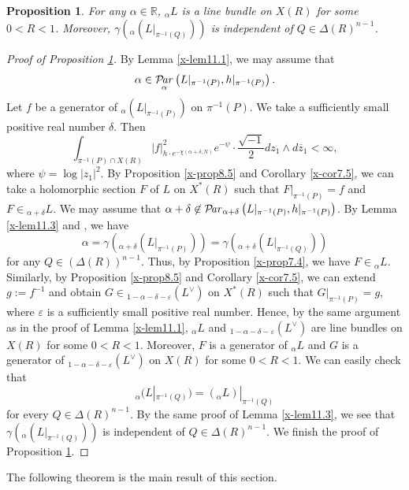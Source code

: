 \documentclass[12pt,twoside]{amsart}
\DeclareMathOperator{\Par}{\mathcal{P}\!\it{ar}}
\newtheorem{prop}[thm]{Proposition}
\theoremstyle{definition}
\begin{document}
\begin{prop}\label{x-prop11.4}
For any $\alpha \in \mathbb R$, ${}_\alpha L$ is a line bundle 
on $X(R)$ for some $0<R<1$. 
Moreover, $\gamma \left({}_\alpha (L|_{\pi^{-1}(Q)})\right)$ is independent of 
$Q\in \Delta(R)^{n-1}$. 
\end{prop}
\begin{proof}[Proof of Proposition \ref{x-prop11.4}]
By Lemma \ref{x-lem11.1}, we may assume that 
\[
\alpha \in \Par_\alpha \left(L|_{\pi^{-1}(P)}, h|_{\pi^{-1}(P)}\right). 
\]
Let $f$ be a generator of ${}_\alpha (L|_{\pi^{-1}(P)})$ on $\pi^{-1}(P)$. 
We take a sufficiently small positive real number $\delta$. 
Then 
\[
\int _{\pi^{-1}(P)\cap X(R)} |f|^2_{h\cdot e^{-\chi (\alpha +\delta, N)}} 
e^{-\psi}\cdot 
\frac{\sqrt{-1}}{2} dz_1\wedge d\overline z_1<\infty,  
\] 
where $\psi=\log |z_1|^2$. 
By Proposition \ref{x-prop8.5} and Corollary \ref{x-cor7.5}, 
we can take a holomorphic section $F$ of $L$ on $X^*(R)$ 
such that $F|_{\pi^{-1}(P)}=f$ and $F\in{}_{\alpha +\delta}L$. 
We may assume that 
$\alpha +\delta\not\in \Par_{\alpha+\delta} \left(L|_{\pi^{-1}(P)}, 
h|_{\pi^{-1}(P)}\right)$. 
By Lemma \ref{x-lem11.3} and \cite[Lemma 13.1]{fujino-fujisawa-ono}, 
we have 
\[
\alpha=\gamma \left({}_{\alpha+\delta} (L|_{\pi^{-1}(P)})\right)
=\gamma \left({}_{\alpha+\delta} (L|_{\pi^{-1}(Q)})\right)
\]
for any $Q\in (\Delta(R))^{n-1}$. 
Thus, by Proposition \ref{x-prop7.4}, 
we have $F\in {}_\alpha L$. Similarly, by 
Proposition \ref{x-prop8.5} and Corollary \ref{x-cor7.5}, we can extend $g:=f^{-1}$ and obtain $G\in 
{}_{1-\alpha -\delta-\varepsilon} (L^\vee)$ on $X^*(R)$ such that 
$G|_{\pi^{-1}(P)} =g$, where 
$\varepsilon$ is a sufficiently small positive real number. Hence, by the same argument 
as in the proof of Lemma \ref{x-lem11.1}, 
${}_\alpha L$ and ${}_{1-\alpha -\delta-\varepsilon}(L^\vee)$ are line bundles 
on $X(R)$ for some $0<R<1$. 
Moreover, $F$ is a generator of ${}_\alpha L$ and 
$G$ is a generator of ${}_{1-\alpha-\delta-\varepsilon} (L^\vee)$ on 
$X(R)$ for some $0<R<1$. 
We can easily check that 
\[
{}_\alpha (L|_{\pi^{-1}(Q)})=({}_\alpha L)|_{\pi^{-1}(Q)}
\]
for every $Q\in \Delta(R)^{n-1}$. 
By the same proof of Lemma \ref{x-lem11.3}, 
we see that $\gamma \left({}_\alpha (L|_{\pi^{-1}(Q)})\right)$ is independent 
of $Q\in \Delta(R)^{n-1}$. 
We finish the proof of Proposition \ref{x-prop11.4}. 
\end{proof}

The following theorem is 
the main result of this section. 
\end{document}
